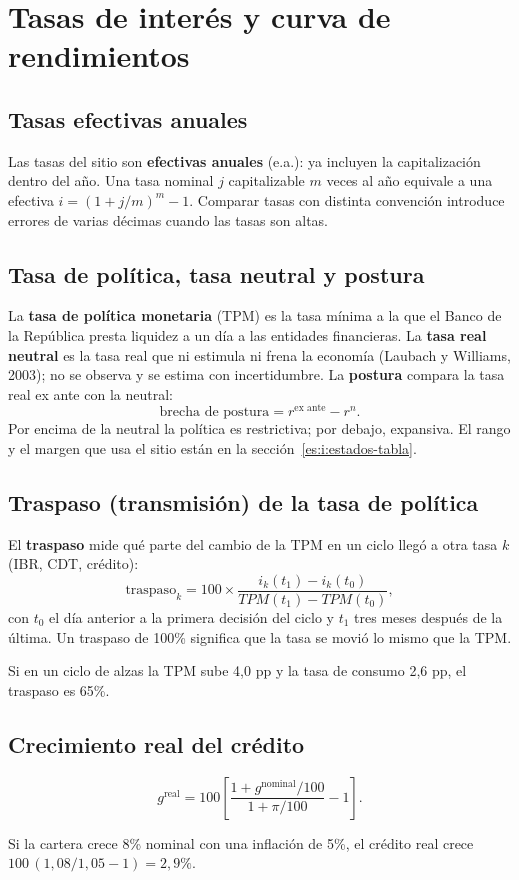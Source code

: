 \chapter{Tasas de interés y curva de rendimientos}
\label{es:f:tasas}

\section{Tasas efectivas anuales}
Las tasas del sitio son \textbf{efectivas anuales} (e.a.): ya incluyen la capitalización dentro del año. Una tasa
nominal $j$ capitalizable $m$ veces al año equivale a una efectiva $i=(1+j/m)^m-1$. Comparar tasas con distinta
convención introduce errores de varias décimas cuando las tasas son altas.

\section{Tasa de política, tasa neutral y postura}
\label{es:f:neutral}
La \textbf{tasa de política monetaria} (TPM) es la tasa mínima a la que el Banco de la República presta liquidez a
un día a las entidades financieras. La \textbf{tasa real neutral} es la tasa real que ni estimula ni frena la
economía (Laubach y Williams, 2003); no se observa y se estima con incertidumbre. La \textbf{postura} compara la tasa
real ex ante con la neutral:
\[
\text{brecha de postura}=r^{\text{ex ante}}-r^{n}.
\]
Por encima de la neutral la política es restrictiva; por debajo, expansiva. El rango y el margen que usa el sitio
están en la sección~\ref{es:i:estados-tabla}.

\section{Traspaso (transmisión) de la tasa de política}
\label{es:f:traspaso}
El \textbf{traspaso} mide qué parte del cambio de la TPM en un ciclo llegó a otra tasa $k$ (IBR, CDT, crédito):
\[
\text{traspaso}_k=100\times\frac{i_k(t_1)-i_k(t_0)}{TPM(t_1)-TPM(t_0)},
\]
con $t_0$ el día anterior a la primera decisión del ciclo y $t_1$ tres meses después de la última. Un traspaso de
100\% significa que la tasa se movió lo mismo que la TPM.

\begin{dato}
Si en un ciclo de alzas la TPM sube 4,0 pp y la tasa de consumo 2,6 pp, el traspaso es 65\%.
\end{dato}

\section{Crecimiento real del crédito}
\[
g^{\text{real}}=100\left[\frac{1+g^{\text{nominal}}/100}{1+\pi/100}-1\right].
\]
\begin{dato}
Si la cartera crece 8\% nominal con una inflación de 5\%, el crédito real crece $100\,(1{,}08/1{,}05-1)=2{,}9\%$.
\end{dato}

